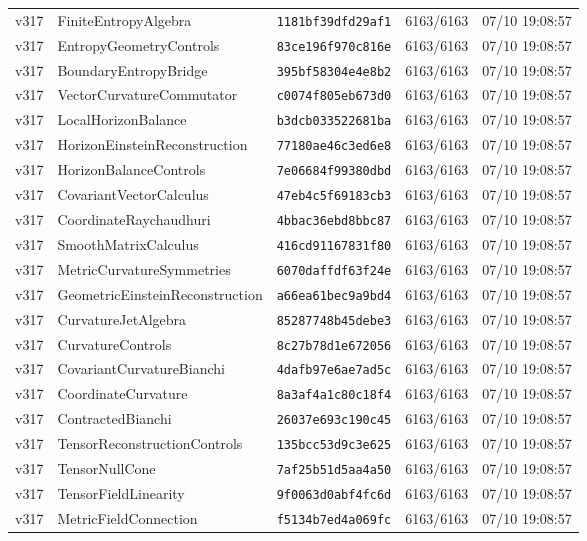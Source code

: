 \documentclass[11pt]{article}
\theoremstyle{definition}\newtheorem{deriv}{Derivação}
\begin{document}
{\begin{longtable}{@{}lllll@{}}
v317 & FiniteEntropyAlgebra & \texttt{1181bf39dfd29af1} & 6163/6163 & 07/10 19:08:57 \\
v317 & EntropyGeometryControls & \texttt{83ce196f970c816e} & 6163/6163 & 07/10 19:08:57 \\
v317 & BoundaryEntropyBridge & \texttt{395bf58304e4e8b2} & 6163/6163 & 07/10 19:08:57 \\
v317 & VectorCurvatureCommutator & \texttt{c0074f805eb673d0} & 6163/6163 & 07/10 19:08:57 \\
v317 & LocalHorizonBalance & \texttt{b3dcb033522681ba} & 6163/6163 & 07/10 19:08:57 \\
v317 & HorizonEinsteinReconstruction & \texttt{77180ae46c3ed6e8} & 6163/6163 & 07/10 19:08:57 \\
v317 & HorizonBalanceControls & \texttt{7e06684f99380dbd} & 6163/6163 & 07/10 19:08:57 \\
v317 & CovariantVectorCalculus & \texttt{47eb4c5f69183cb3} & 6163/6163 & 07/10 19:08:57 \\
v317 & CoordinateRaychaudhuri & \texttt{4bbac36ebd8bbc87} & 6163/6163 & 07/10 19:08:57 \\
v317 & SmoothMatrixCalculus & \texttt{416cd91167831f80} & 6163/6163 & 07/10 19:08:57 \\
v317 & MetricCurvatureSymmetries & \texttt{6070daffdf63f24e} & 6163/6163 & 07/10 19:08:57 \\
v317 & GeometricEinsteinReconstruction & \texttt{a66ea61bec9a9bd4} & 6163/6163 & 07/10 19:08:57 \\
v317 & CurvatureJetAlgebra & \texttt{85287748b45debe3} & 6163/6163 & 07/10 19:08:57 \\
v317 & CurvatureControls & \texttt{8c27b78d1e672056} & 6163/6163 & 07/10 19:08:57 \\
v317 & CovariantCurvatureBianchi & \texttt{4dafb97e6ae7ad5c} & 6163/6163 & 07/10 19:08:57 \\
v317 & CoordinateCurvature & \texttt{8a3af4a1c80c18f4} & 6163/6163 & 07/10 19:08:57 \\
v317 & ContractedBianchi & \texttt{26037e693c190c45} & 6163/6163 & 07/10 19:08:57 \\
v317 & TensorReconstructionControls & \texttt{135bcc53d9c3e625} & 6163/6163 & 07/10 19:08:57 \\
v317 & TensorNullCone & \texttt{7af25b51d5aa4a50} & 6163/6163 & 07/10 19:08:57 \\
v317 & TensorFieldLinearity & \texttt{9f0063d0abf4fc6d} & 6163/6163 & 07/10 19:08:57 \\
v317 & MetricFieldConnection & \texttt{f5134b7ed4a069fc} & 6163/6163 & 07/10 19:08:57 \\

\end{longtable}}
\end{document}
